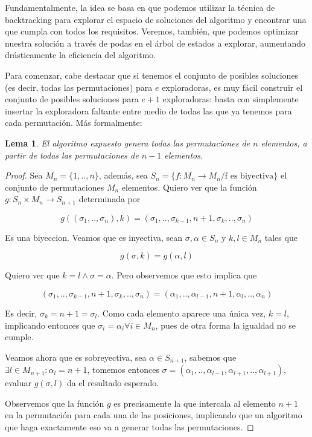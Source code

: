 \documentclass{article}
\newtheorem{lemma}{Lema}[theorem]
\theoremstyle{definition}
\theoremstyle{remark}
\begin{document}
Fundamentalmente, la idea se basa en que podemos utilizar la técnica de backtracking para explorar el espacio de soluciones del algoritmo y encontrar una que cumpla con todos los requisitos. Veremos, también, que podemos optimizar nuestra solución a través de podas en el árbol de estados a explorar, aumentando drásticamente la eficiencia del algoritmo.

Para comenzar, cabe destacar que si tenemos el conjunto de posibles soluciones (es decir, todas las permutaciones) para $e$ exploradoras, es muy fácil construir el conjunto de posibles soluciones para $e+1$ exploradoras: basta con simplemente insertar la exploradora faltante entre medio de todas las que ya tenemos para cada permutación. Más formalmente:

\begin{lemma}
El algoritmo expuesto genera todas las permutaciones de $n$ elementos, a partir de todas las permutaciones de $n-1$ elementos.
\end{lemma}

\begin{proof}
Sea $M_n = \{1, .., n\}$, además, sea $S_n = \{ f : M_n \to M_n / \text{f es biyectiva}\}$ el conjunto de permutaciones $M_n$ elementos. Quiero ver que la función $g : S_n \times M_n \to S_{n+1}$ determinada por

$$g((\sigma_1, .., \sigma_n), k) = (\sigma_1, .., \sigma_{k-1}, n+1, \sigma_k, .., \sigma_n)$$

Es una biyeccion. Veamos que es inyectiva, sean $\sigma, \alpha \in S_n$ y $k, l \in M_n$ tales que

$$g(\sigma, k) = g(\alpha, l)$$

Quiero ver que $k = l \wedge \sigma = \alpha$. Pero observemos que esto implica que

$$(\sigma_1, .., \sigma_{k-1}, n+1, \sigma_k, .., \sigma_n) = (\alpha_1, .., \alpha_{l-1}, n+1, \alpha_l, .., \alpha_n)$$

Es decir, $\sigma_k = n + 1 = \sigma_l$. Como cada elemento aparece una única vez, $k = l$, implicando entonces que $\sigma_i = \alpha_i \forall i \in M_n$, pues de otra forma la igualdad no se cumple.

Veamos ahora que es sobreyectiva, sea $\alpha \in S_{n+1}$, sabemos que $\exists l \in M_{n+1} : \alpha_l = n+1$, tomemos entonces $\sigma = (\alpha_1, .., \alpha_{l-1}, \alpha_{l+1}, .., \alpha_{l+1})$, evaluar $g(\sigma, l)$ da el resultado esperado.

Observemos que la función $g$ es precisamente la que intercala al elemento $n+1$ en la permutación para cada una de las posiciones, implicando que un algoritmo que haga exactamente eso va a generar todas las permutaciones.
\end{proof}
\end{document}
